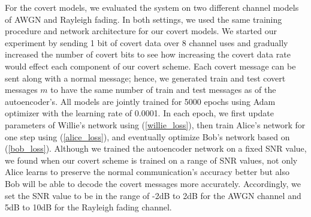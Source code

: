 For the covert models, we evaluated the system on two different channel models of AWGN and Rayleigh fading. In both settings, we used the same training procedure and network architecture for our covert models. We started our experiment by sending 1 bit of covert data over 8 channel uses and gradually increased the number of covert bits to see how increasing the covert data rate would effect each component of our covert scheme. Each covert message can be sent along with a normal message; hence, we generated train and test covert messages \(m\) to have the same number of train and test messages as of the autoencoder's. All models are jointly trained for 5000 epochs using Adam optimizer with the learning rate of 0.0001. In each epoch, we first update parameters of Willie's network using (\ref{willie_loss}), then train Alice's network for one step using (\ref{alice_loss}), and eventually optimize Bob's network based on (\ref{bob_loss}). Although we trained the autoencoder network on a fixed SNR value, we found when our covert scheme is trained on a range of SNR values, not only Alice learns to preserve the normal communication's accuracy better but also Bob will be able to decode the covert messages more accurately. Accordingly, we set the SNR value to be in the range of -2dB to 2dB for the AWGN channel and 5dB to 10dB for the Rayleigh fading channel.
